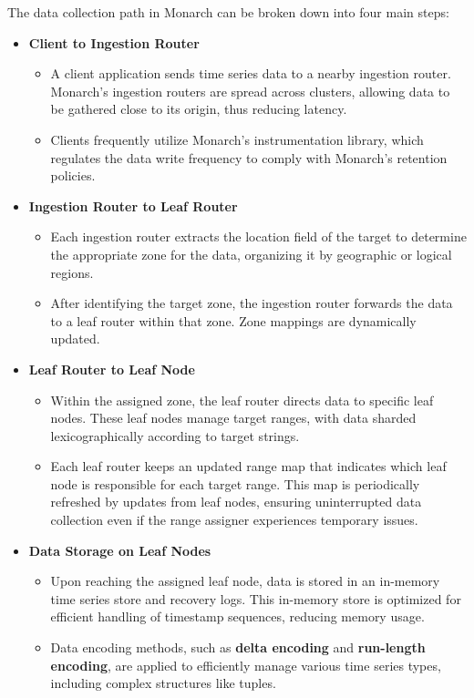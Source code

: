 The data collection path in Monarch can be broken down into four main steps:

\begin{itemize}
    \item \textbf{Client to Ingestion Router}
    \begin{itemize}
        \item A client application sends time series data to a nearby ingestion router. Monarch's ingestion routers are spread across clusters, allowing data to be gathered close to its origin, thus reducing latency.
        \item Clients frequently utilize Monarch's instrumentation library, which regulates the data write frequency to comply with Monarch's retention policies.
    \end{itemize}
    
    \item \textbf{Ingestion Router to Leaf Router}
    \begin{itemize}
        \item Each ingestion router extracts the location field of the target to determine the appropriate zone for the data, organizing it by geographic or logical regions.
        \item After identifying the target zone, the ingestion router forwards the data to a leaf router within that zone. Zone mappings are dynamically updated.
    \end{itemize}

    \item \textbf{Leaf Router to Leaf Node}
    \begin{itemize}
        \item Within the assigned zone, the leaf router directs data to specific leaf nodes. These leaf nodes manage target ranges, with data sharded lexicographically according to target strings.
        \item Each leaf router keeps an updated range map that indicates which leaf node is responsible for each target range. This map is periodically refreshed by updates from leaf nodes, ensuring uninterrupted data collection even if the range assigner experiences temporary issues.
    \end{itemize}
    
    \item \textbf{Data Storage on Leaf Nodes}
    \begin{itemize}
        \item Upon reaching the assigned leaf node, data is stored in an in-memory time series store and recovery logs. This in-memory store is optimized for efficient handling of timestamp sequences, reducing memory usage.
        \item Data encoding methods, such as \textbf{delta encoding} and \textbf{run-length encoding}, are applied to efficiently manage various time series types, including complex structures like tuples.
    \end{itemize}
\end{itemize}
